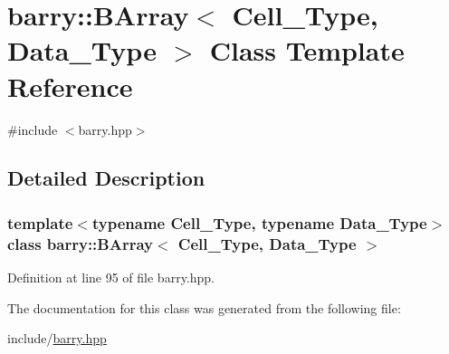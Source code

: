 \hypertarget{classbarry_1_1_b_array}{}\section{barry\+:\+:B\+Array$<$ Cell\+\_\+\+Type, Data\+\_\+\+Type $>$ Class Template Reference}
\label{classbarry_1_1_b_array}


{\ttfamily \#include $<$barry.\+hpp$>$}



\subsection{Detailed Description}
\subsubsection*{template$<$typename Cell\+\_\+\+Type, typename Data\+\_\+\+Type$>$\newline
class barry\+::\+B\+Array$<$ Cell\+\_\+\+Type, Data\+\_\+\+Type $>$}



Definition at line 95 of file barry.\+hpp.



The documentation for this class was generated from the following file\+:\begin{DoxyCompactItemize}
\item 
include/\hyperlink{barry_8hpp}{barry.\+hpp}\end{DoxyCompactItemize}
